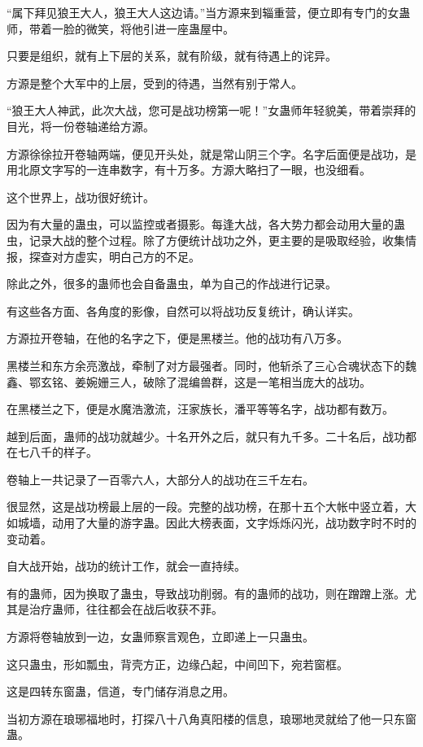 \begin{this_body}
“属下拜见狼王大人，狼王大人这边请。”当方源来到辎重营，便立即有专门的女蛊师，带着一脸的微笑，将他引进一座蛊屋中。

只要是组织，就有上下层的关系，就有阶级，就有待遇上的诧异。

方源是整个大军中的上层，受到的待遇，当然有别于常人。

“狼王大人神武，此次大战，您可是战功榜第一呢！”女蛊师年轻貌美，带着崇拜的目光，将一份卷轴递给方源。

方源徐徐拉开卷轴两端，便见开头处，就是常山阴三个字。名字后面便是战功，是用北原文字写的一连串数字，有十万多。方源大略扫了一眼，也没细看。

这个世界上，战功很好统计。

因为有大量的蛊虫，可以监控或者摄影。每逢大战，各大势力都会动用大量的蛊虫，记录大战的整个过程。除了方便统计战功之外，更主要的是吸取经验，收集情报，探查对方虚实，明白己方的不足。

除此之外，很多的蛊师也会自备蛊虫，单为自己的作战进行记录。

有这些各方面、各角度的影像，自然可以将战功反复统计，确认详实。

方源拉开卷轴，在他的名字之下，便是黑楼兰。他的战功有八万多。

黑楼兰和东方余亮激战，牵制了对方最强者。同时，他斩杀了三心合魂状态下的魏鑫、鄂玄铭、姜婉姗三人，破除了混编兽群，这是一笔相当庞大的战功。

在黑楼兰之下，便是水魔浩激流，汪家族长，潘平等等名字，战功都有数万。

越到后面，蛊师的战功就越少。十名开外之后，就只有九千多。二十名后，战功都在七八千的样子。

卷轴上一共记录了一百零六人，大部分人的战功在三千左右。

很显然，这是战功榜最上层的一段。完整的战功榜，在那十五个大帐中竖立着，大如城墙，动用了大量的游字蛊。因此大榜表面，文字烁烁闪光，战功数字时不时的变动着。

自大战开始，战功的统计工作，就会一直持续。

有的蛊师，因为换取了蛊虫，导致战功削弱。有的蛊师的战功，则在蹭蹭上涨。尤其是治疗蛊师，往往都会在战后收获不菲。

方源将卷轴放到一边，女蛊师察言观色，立即递上一只蛊虫。

这只蛊虫，形如瓢虫，背壳方正，边缘凸起，中间凹下，宛若窗框。

这是四转东窗蛊，信道，专门储存消息之用。

当初方源在琅琊福地时，打探八十八角真阳楼的信息，琅琊地灵就给了他一只东窗蛊。


\end{this_body}

